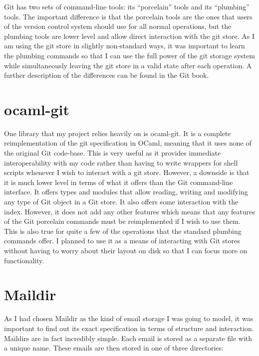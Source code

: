 Git has two sets of command-line tools: its ``porcelain'' tools and its ``plumbing'' tools. The important difference is that the porcelain tools are the ones that users of the version control system should use for all normal operations, but the plumbing tools are lower level and allow direct interaction with the git store. As I am using the git store in slightly non-standard ways, it was important to learn the plumbing commands so that I can use the full power of the git storage system while simultaneously leaving the git store in a valid state after each operation. A further description of the differences can be found in the Git book\cite{chacon2014git}.

\section{ocaml-git}

One library that my project relies heavily on is ocaml-git\cite{code_ocaml-git}. It is a complete reimplementation of the git specification in OCaml, meaning that it uses none of the original Git code-base. This is very useful as it provides immediate interoperability with my code rather than having to write wrappers for shell scripts whenever I wish to interact with a git store. However,  a downside is that it is much lower level in terms of what it offers than the Git command-line interface. It offers types and modules that allow reading, writing and modifying any type of Git object in a Git store. It also offers some interaction with the index. However, it does not add any other features which means that any features of the Git porcelain commands must be reimplemented if I wish to use them. This is also true for quite a few of the operations that the standard plumbing commands offer. I planned to use it as a means of interacting with Git stores without having to worry about their layout on disk so that I can focus more on functionality.

\section{Maildir}

As I had chosen Maildir as the kind of email storage I was going to model, it was important to find out its exact specification in terms of structure and interaction. Maildirs are in fact incredibly simple. Each email is stored as a separate file with a unique name. These emails are then stored in one of three directories:

